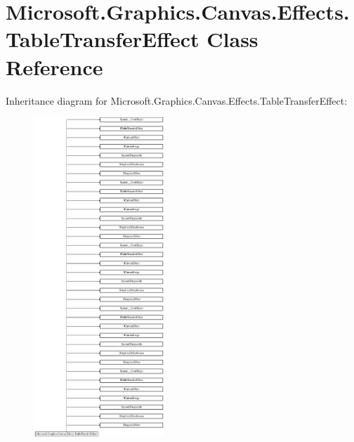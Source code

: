 \hypertarget{class_microsoft_1_1_graphics_1_1_canvas_1_1_effects_1_1_table_transfer_effect}{}\section{Microsoft.\+Graphics.\+Canvas.\+Effects.\+Table\+Transfer\+Effect Class Reference}
\label{class_microsoft_1_1_graphics_1_1_canvas_1_1_effects_1_1_table_transfer_effect}
Inheritance diagram for Microsoft.\+Graphics.\+Canvas.\+Effects.\+Table\+Transfer\+Effect\+:\begin{figure}[H]
\begin{center}
\leavevmode
\includegraphics[height=12.000000cm]{class_microsoft_1_1_graphics_1_1_canvas_1_1_effects_1_1_table_transfer_effect}
\end{center}
\end{figure}
